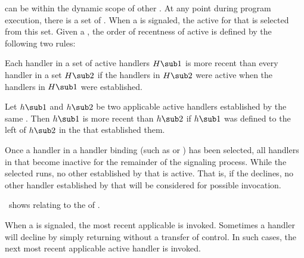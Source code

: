   can be  within the
dynamic scope of other  .
At any point during program execution, there is a set of  .
When a  is signaled, the  active 
for that  is selected from this set.
Given a , the order of recentness of 
active  is defined by the following two rules:
 
\beginlist
 
  Each handler in a set of active handlers $H\sub 1$ is
more recent than every handler in a set $H\sub 2$ if the
handlers in $H\sub 2$ were active when the handlers in $H\sub 1$ were
established.
 
  Let $h\sub 1$ and $h\sub 2$ be two applicable active
handlers established by the same . Then $h\sub 1$ is
more recent than $h\sub 2$ if $h\sub 1$ was defined to the left of
$h\sub 2$ in the  that established them.
 
\endlist
 
Once a handler in a handler binding  (such as 
 or ) has been selected, all
handlers in that  become inactive for 
the remainder of the signaling process.
While the selected  runs, no other  established
by that  is active. That is, if the  declines, 
no other handler established by that  will be considered for possible invocation.

\Thenextfigure\ shows  relating to 
the  of .

 
 
When a  is signaled, the most recent
applicable   is invoked.  
Sometimes a handler will decline by simply returning
without a transfer of control.
In such cases, the next most recent applicable active handler is
invoked. 
 
